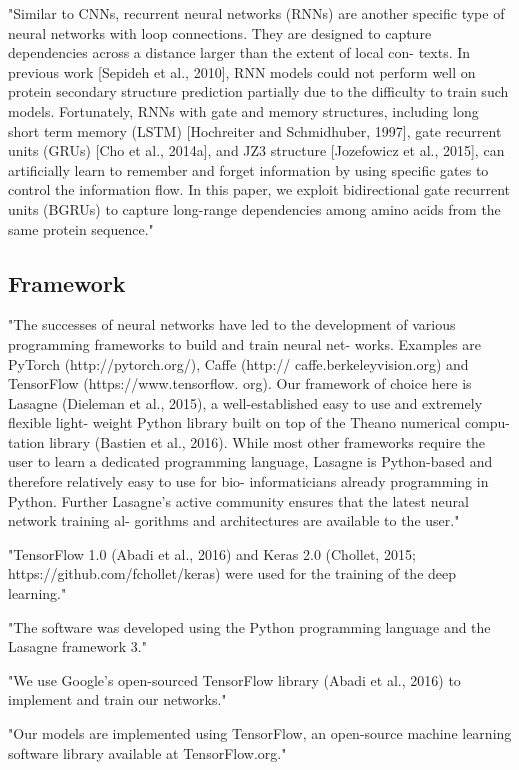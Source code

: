 \documentclass[]{scrartcl}
\begin{document}
"Similar to CNNs, recurrent neural networks (RNNs) are another specific type of neural networks with loop connections. They are designed to capture dependencies across a distance larger than the extent of local con- texts. In previous work [Sepideh et al., 2010], RNN models could not perform well on protein secondary structure prediction partially due to the difficulty to train such models. Fortunately, RNNs with gate and memory structures, including long short term memory (LSTM) [Hochreiter and Schmidhuber, 1997], gate recurrent units (GRUs) [Cho et al., 2014a], and JZ3 structure [Jozefowicz et al., 2015], can artificially learn to remember and forget information by using specific gates to control the information flow. In this paper, we exploit bidirectional gate recurrent units (BGRUs) to capture long-range dependencies among amino acids from the same protein sequence." \cite{Li2016}

\subsection{Framework}
"The successes of neural networks have led to the development of various programming frameworks to build and train neural net- works. Examples are PyTorch (http://pytorch.org/), Caffe (http:// caffe.berkeleyvision.org) and TensorFlow (https://www.tensorflow. org). Our framework of choice here is Lasagne (Dieleman et al., 2015), a well-established easy to use and extremely flexible light- weight Python library built on top of the Theano numerical compu- tation library (Bastien et al., 2016). While most other frameworks require the user to learn a dedicated programming language, Lasagne is Python-based and therefore relatively easy to use for bio- informaticians already programming in Python. Further Lasagne’s active community ensures that the latest neural network training al- gorithms and architectures are available to the user." \cite{Jurtz2017}

"TensorFlow 1.0 (Abadi et al., 2016) and Keras 2.0 (Chollet, 2015; https://github.com/fchollet/keras) were used for the training of the deep learning." \cite{Fang2017}

"The software was developed using the Python programming language and the Lasagne framework 3." \cite{Hattori2017}

"We use Google’s open-sourced TensorFlow library (Abadi et al., 2016) to implement and train our networks." \cite{Heffernan2017}

"Our models are implemented using TensorFlow, an open-source machine learning software library available at TensorFlow.org." \cite{Busia2017}
\end{document}
